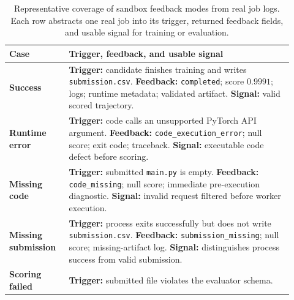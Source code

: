 \begin{table}[h!]
  \centering
  \caption{Representative coverage of sandbox feedback modes from real job logs. Each row abstracts one real job into its trigger, returned feedback fields, and usable signal for training or evaluation.}
  \label{tab:sandbox-real-cases}
  \vspace{0.4em}
  \footnotesize
  \setlength{\tabcolsep}{5pt}
  \renewcommand{\arraystretch}{1.14}
  \begin{tabular}{@{}>{\raggedright\arraybackslash}p{0.19\linewidth}>{\raggedright\arraybackslash}p{0.73\linewidth}@{}}
    \toprule
    \textbf{Case} & \textbf{Trigger, feedback, and usable signal} \\
    \midrule
    \textbf{Success}
    & \textbf{Trigger:} candidate finishes training and writes \texttt{submission.csv}.\newline
      \textbf{Feedback:} \texttt{completed}; score $0.9991$; logs; runtime metadata; validated artifact.\newline
      \textbf{Signal:} valid scored trajectory. \\
    \addlinespace[2pt]
    \textbf{Runtime error}
    & \textbf{Trigger:} code calls an unsupported PyTorch API argument.\newline
      \textbf{Feedback:} \texttt{code\_execution\_error}; null score; exit code; traceback.\newline
      \textbf{Signal:} executable code defect before scoring. \\
    \addlinespace[2pt]
    \textbf{Missing code}
    & \textbf{Trigger:} submitted \texttt{main.py} is empty.\newline
      \textbf{Feedback:} \texttt{code\_missing}; null score; immediate pre-execution diagnostic.\newline
      \textbf{Signal:} invalid request filtered before worker execution. \\
    \addlinespace[2pt]
    \textbf{Missing submission}
    & \textbf{Trigger:} process exits successfully but does not write \texttt{submission.csv}.\newline
      \textbf{Feedback:} \texttt{submission\_missing}; null score; missing-artifact log.\newline
      \textbf{Signal:} distinguishes process success from valid submission. \\
    \addlinespace[2pt]
    \textbf{Scoring failed}
    & \textbf{Trigger:} submitted file violates the evaluator schema.\newline

\end{tabular}
\end{table}
